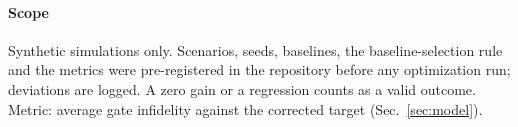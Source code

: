\paragraph{Scope} Synthetic simulations only. Scenarios, seeds, baselines, the
baseline-selection rule and the metrics were pre-registered in the repository before any
optimization run; deviations are logged. A zero gain or a regression counts as a valid outcome. Metric: average gate infidelity against the corrected target
(Sec.~\ref{sec:model}).
